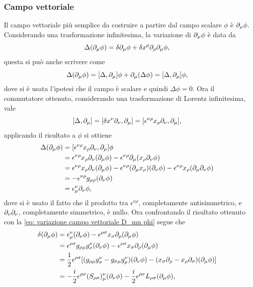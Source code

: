 \subsubsection{Campo vettoriale}
Il campo vettoriale più semplice da costruire a partire dal campo scalare $\phi$ è $\partial_\mu\phi$. Considerando una trasformazione infinitesima, la variazione di $\partial_\mu\phi$ è data da
\begin{equation}
\label{eq: variazione campo vettoriale D_mu phi}
    \Delta(\partial_\mu\phi) = \delta\partial_\mu\phi + \delta x^\rho\partial_\rho\partial_\mu\phi,
\end{equation}
questa si può anche scrivere come
\begin{equation}
    \Delta(\partial_\mu\phi) = [\Delta,\partial_\mu]\phi + \partial_\mu(\Delta\phi) = [\Delta,\partial_\mu]\phi,
\end{equation}
dove si è usata l'ipotesi che il campo è scalare e quindi $\Delta\phi = 0$. Ora il commutatore ottenuto, considerando una trasformazione di Lorentz infinitesima, vale
\begin{equation}
    [\Delta,\partial_\mu] = [\delta x^\nu\partial_\nu,\partial_\mu] = [\epsilon^{\nu\rho}x_\rho\partial_\nu,\partial_\mu],
\end{equation}
applicando il risultato a $\phi$ si ottiene
\begin{equation}
    \begin{split}
        \Delta(\partial_\mu\phi) &=  [\epsilon^{\nu\rho}x_\rho\partial_\nu,\partial_\mu]\phi \\
        &= \epsilon^{\nu\rho}x_\rho\partial_\nu(\partial_\mu\phi) - \epsilon^{\nu\rho}\partial_\mu(x_\rho\partial_\nu\phi) \\
        &= \epsilon^{\nu\rho}x_\rho\partial_\nu(\partial_\mu\phi) - \epsilon^{\nu\rho}(\partial_\mu x_\rho)(\partial_\nu\phi) - \epsilon^{\nu\rho}x_\rho(\partial_\mu\partial_\nu\phi) \\
        &= - \epsilon^{\nu\rho}g_{\mu\rho}(\partial_\nu\phi) \\
        &= \epsilon^\nu_\mu\partial_\nu\phi,
    \end{split}
\end{equation}
dove si è usato il fatto che il prodotto tra $\epsilon^{\nu\rho}$, completamente antisimmetrico, e $\partial_\nu\partial_\nu$, completamente simmetrico, è nullo. Ora confrontando il risultato ottenuto con la \eqref{eq: variazione campo vettoriale D_mu phi} segue che
\begin{equation}
    \begin{split}
        \delta(\partial_\mu\phi) &= \epsilon^\nu_\mu(\partial_\nu\phi) - \epsilon^{\rho\sigma}x_\sigma\partial_\rho(\partial_\mu\phi) \\
        &= \epsilon^{\rho\sigma}g_{\rho\mu}g^\nu_\sigma(\partial_\nu\phi) - \epsilon^{\rho\sigma}x_\sigma\partial_\rho(\partial_\mu\phi) \\
        &= \frac{1}{2}\epsilon^{\rho\sigma}[(g_{\rho\mu}g^\nu_\sigma - g_{\sigma\mu}g^\nu_\rho)(\partial_\nu\phi) - (x_\sigma\partial_\rho - x_\rho\partial_\sigma)(\partial_\mu\phi)] \\
        &=-\frac{i}{2}\epsilon^{\rho\sigma}(S_{\rho\sigma})^\nu_\mu(\partial_\nu\phi) - \frac{i}{2}\epsilon^{\rho\sigma}L_{\rho\sigma}(\partial_\mu\phi),
    \end{split}
\end{equation}
